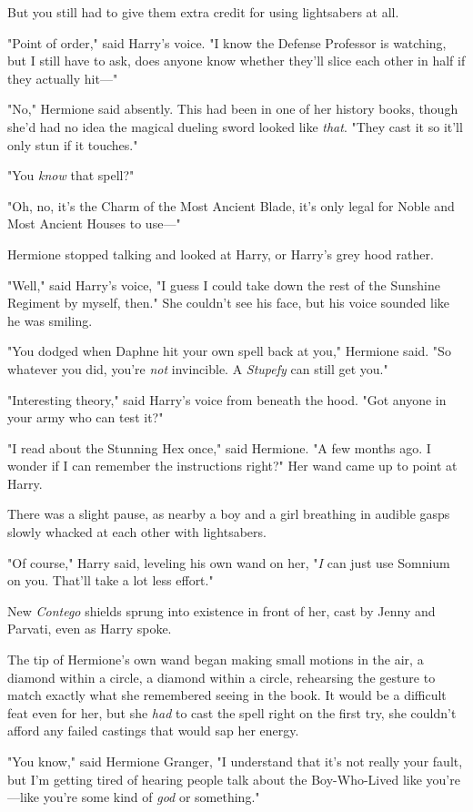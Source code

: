 But you still had to give them extra credit for using lightsabers at all.

"Point of order," said Harry's voice. "I know the Defense Professor is
watching, but I still have to ask, does anyone know whether they'll slice each
other in half if they actually hit—"

"No," Hermione said absently. This had been in one of her history books, though
she'd had no idea the magical dueling sword looked like \emph{that}. "They cast
it so it'll only stun if it touches."

"You \emph{know} that spell?"

"Oh, no, it's the Charm of the Most Ancient Blade, it's only legal for Noble
and Most Ancient Houses to use—"

Hermione stopped talking and looked at Harry, or Harry's grey hood rather.

"Well," said Harry's voice, "I guess I could take down the rest of the Sunshine
Regiment by myself, then." She couldn't see his face, but his voice sounded
like he was smiling.

"You dodged when Daphne hit your own spell back at you," Hermione said. "So
whatever you did, you're \emph{not} invincible. A \emph{Stupefy} can still get
you."

"Interesting theory," said Harry's voice from beneath the hood. "Got anyone in
your army who can test it?"

"I read about the Stunning Hex once," said Hermione. "A few months ago. I
wonder if I can remember the instructions right?" Her wand came up to point at
Harry.

There was a slight pause, as nearby a boy and a girl breathing in audible gasps
slowly whacked at each other with lightsabers.

"Of course," Harry said, leveling his own wand on her, "\emph{I} can just use
Somnium on you. That'll take a lot less effort."

New \emph{Contego} shields sprung into existence in front of her, cast by Jenny
and Parvati, even as Harry spoke.

The tip of Hermione's own wand began making small motions in the air, a diamond
within a circle, a diamond within a circle, rehearsing the gesture to match
exactly what she remembered seeing in the book. It would be a difficult feat
even for her, but she \emph{had} to cast the spell right on the first try, she
couldn't afford any failed castings that would sap her energy.

"You know," said Hermione Granger, "I understand that it's not really your
fault, but I'm getting tired of hearing people talk about the Boy-Who-Lived
like you're—like you're some kind of \emph{god} or something."

